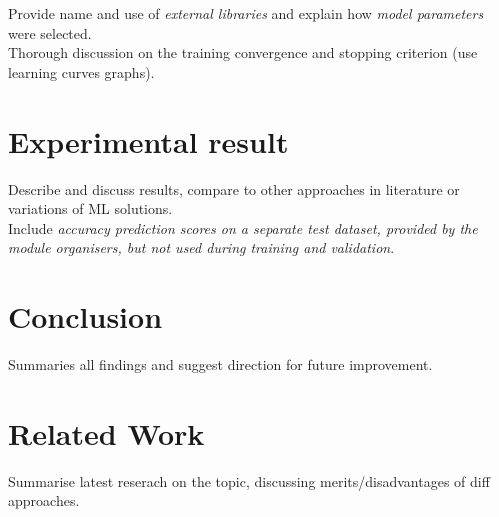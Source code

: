 \documentclass[conference]{IEEEtran}
\begin{document}
Provide name and use of \textit{external libraries} and explain how \textit{model parameters} were selected.\\

Thorough discussion on the training convergence and stopping criterion (use learning curves graphs).\\

\section{Experimental result} \label{s-exp-res}

Describe and discuss results, compare to other approaches in literature or variations of ML solutions.\\

Include \textit{accuracy prediction scores on a separate test dataset, provided by the module organisers, but not used during training and validation}.\\

\section{Conclusion} \label{s-concl}

Summaries all findings and suggest direction for future improvement.\\

\section{Related Work} \label{s-rel-work}

Summarise latest reserach on the topic, discussing merits/disadvantages of diff approaches.\\




\end{document}
